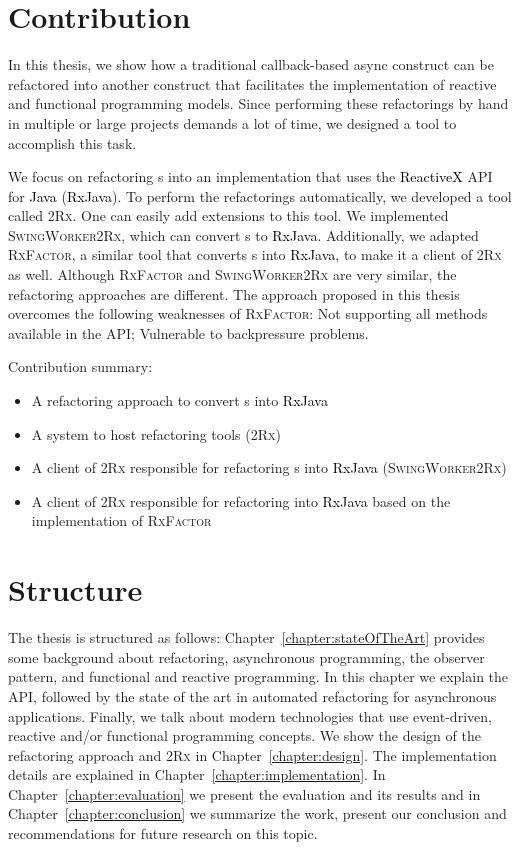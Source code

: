 \documentclass[type=bsc,accentcolor=tud9c]{tudthesis}
\newcommand{\framework}[1]{\textcolor{black}{#1}}
\newcommand{\toolcore}{\textsc{2Rx}}
\newcommand{\toolextension}{\textsc{SwingWorker2Rx}}
\begin{document}
\section{Contribution}

In this thesis, we show how a traditional callback-based async construct can be refactored into another construct that facilitates the implementation of reactive and functional programming models. Since performing these refactorings by hand in multiple or large projects demands a lot of time, we designed a tool to accomplish this task.

We focus on refactoring s into an implementation that uses the \framework{ReactiveX} API for \framework{Java} (\framework{RxJava}). To perform the refactorings automatically, we developed a tool called \toolcore{}. One can easily add extensions to this tool. We implemented \toolextension{}, which can convert s to \framework{RxJava}. Additionally, we adapted \textsc{RxFactor}, a similar tool that converts s into \framework{RxJava}, to make it a client of \toolcore{} as well. Although \textsc{RxFactor} and \toolextension{} are very similar, the refactoring approaches are different. The approach proposed in this thesis overcomes the following weaknesses of \textsc{RxFactor}: Not supporting all methods available in the  API; Vulnerable to backpressure problems.

Contribution summary:
\begin{itemize}
	\item A refactoring approach to convert s into \framework{RxJava}
	\item A system to host refactoring tools (\toolcore{})
	\item A client of \toolcore{} responsible for refactoring s into \framework{RxJava} (\toolextension{})
	\item A client of \toolcore{} responsible for refactoring  into \framework{RxJava} based on the implementation of \textsc{RxFactor}
\end{itemize}


\section{Structure}
The thesis is structured as follows: Chapter~\ref{chapter:stateOfTheArt} provides some background about refactoring, asynchronous programming, the observer pattern, and functional and reactive programming. In this chapter we explain the  API, followed by the state of the art in automated refactoring for asynchronous applications. Finally, we talk about modern technologies that use event-driven, reactive and/or functional programming concepts. We show the design of the refactoring approach and \toolcore{} in Chapter~\ref{chapter:design}. The implementation details are explained in Chapter~\ref{chapter:implementation}. In Chapter~\ref{chapter:evaluation} we present the evaluation and its results and in Chapter~\ref{chapter:conclusion} we summarize the work, present our conclusion and recommendations for future research on this topic.
\end{document}
